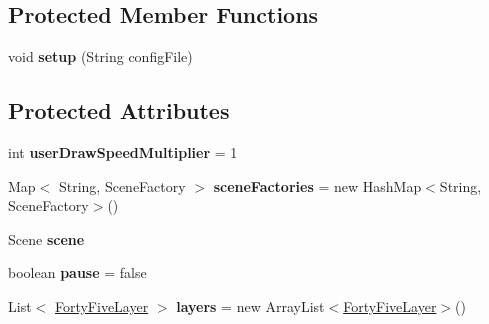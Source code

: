 \subsection*{Protected Member Functions}
\begin{DoxyCompactItemize}
\item 
\hypertarget{classdev_1_1boxy_1_1fortyfive_1_1_forty_five_a9e9e03de2d01c7616e119499926df00f}{
void {\bfseries setup} (String configFile)}
\label{de/df3/classdev_1_1boxy_1_1fortyfive_1_1_forty_five_a9e9e03de2d01c7616e119499926df00f}

\end{DoxyCompactItemize}
\subsection*{Protected Attributes}
\begin{DoxyCompactItemize}
\item 
\hypertarget{classdev_1_1boxy_1_1fortyfive_1_1_forty_five_a440f083698bfb566b67f56523e75d298}{
int {\bfseries userDrawSpeedMultiplier} = 1}
\label{de/df3/classdev_1_1boxy_1_1fortyfive_1_1_forty_five_a440f083698bfb566b67f56523e75d298}

\item 
\hypertarget{classdev_1_1boxy_1_1fortyfive_1_1_forty_five_ae19bff20ef2ec1d7fec04d7b607e8fed}{
Map$<$ String, SceneFactory $>$ {\bfseries sceneFactories} = new HashMap$<$String, SceneFactory$>$()}
\label{de/df3/classdev_1_1boxy_1_1fortyfive_1_1_forty_five_ae19bff20ef2ec1d7fec04d7b607e8fed}

\item 
\hypertarget{classdev_1_1boxy_1_1fortyfive_1_1_forty_five_a4734ca9de2b92107ab707b9562a955cc}{
Scene {\bfseries scene}}
\label{de/df3/classdev_1_1boxy_1_1fortyfive_1_1_forty_five_a4734ca9de2b92107ab707b9562a955cc}

\item 
\hypertarget{classdev_1_1boxy_1_1fortyfive_1_1_forty_five_a8a2cceb2b1c49806efd8923f9e392e25}{
boolean {\bfseries pause} = false}
\label{de/df3/classdev_1_1boxy_1_1fortyfive_1_1_forty_five_a8a2cceb2b1c49806efd8923f9e392e25}

\item 
\hypertarget{classdev_1_1boxy_1_1fortyfive_1_1_forty_five_a980326c88078a98407ab0ca3592dfaf7}{
List$<$ \hyperlink{interfacedev_1_1boxy_1_1fortyfive_1_1_forty_five_layer}{FortyFiveLayer} $>$ {\bfseries layers} = new ArrayList$<$\hyperlink{interfacedev_1_1boxy_1_1fortyfive_1_1_forty_five_layer}{FortyFiveLayer}$>$()}
\label{de/df3/classdev_1_1boxy_1_1fortyfive_1_1_forty_five_a980326c88078a98407ab0ca3592dfaf7}


\end{DoxyCompactItemize}
